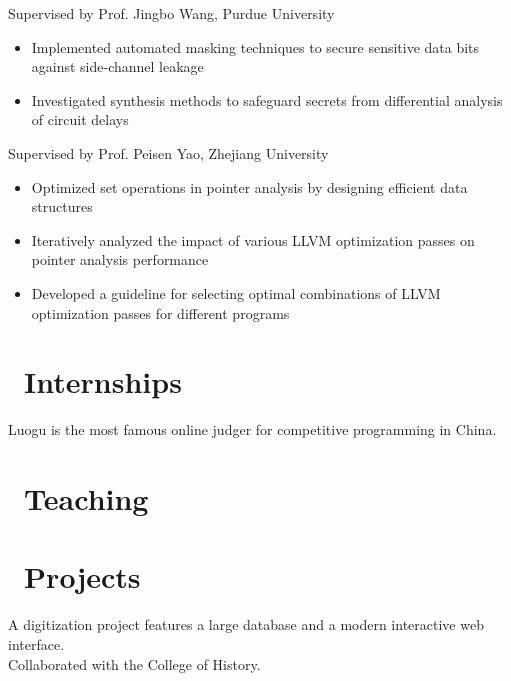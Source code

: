 \documentclass{resume}
\begin{document}
Supervised by Prof. Jingbo Wang, Purdue University
\begin{itemize}[itemsep=0.5ex]  
  \item Implemented automated masking techniques to secure sensitive data bits against side-channel leakage  
  \item Investigated synthesis methods to safeguard secrets from differential analysis of circuit delays  
\end{itemize}

Supervised by Prof. Peisen Yao, Zhejiang University
\begin{itemize}[itemsep=0.5ex]
  \item Optimized set operations in pointer analysis by designing efficient data structures
  \item Iteratively analyzed the impact of various LLVM optimization passes on pointer analysis performance
  \item Developed a guideline for selecting optimal combinations of LLVM optimization passes for different programs
\end{itemize}

\section{\faUsers\ Internships}
Luogu is the most famous online judger for competitive programming in China.

\section{\faBook\ Teaching}

\section{\faCode\ Projects}
A digitization project features a large database and a modern interactive web interface.\\
Collaborated with the College of History.
\end{document}
